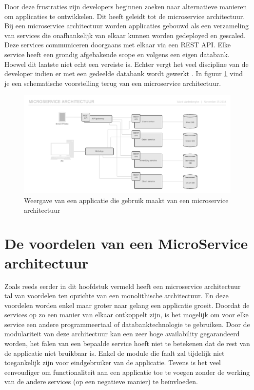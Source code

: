 Door deze frustraties zijn developers beginnen zoeken naar alternatieve manieren om applicaties te ontwikkelen. Dit heeft geleidt tot de microservice architectuur. Bij een microservice architectuur worden applicaties gebouwd als een verzameling van services die onafhankelijk van elkaar kunnen worden gedeployed en gescaled. Deze services communiceren doorgaans met elkaar via een \gls{REST API}. Elke service heeft een grondig afgebakende scope en volgens \textcite{Fowler2014} een eigen databank. Hoewel dit laatste niet echt een vereiste is. Echter vergt het veel discipline van de developer indien er met een gedeelde databank wordt gewerkt \autocite{Young2016}. In figuur \ref{fig:microservices} vind je een schematische voorstelling terug van een microservice architectuur.

\begin{figure}
	\includegraphics[width=\linewidth]{img/microservices.png}
	\caption{Weergave van een applicatie die gebruik maakt van een microservice architectuur}
	\label{fig:microservices}
\end{figure}

\section{De voordelen van een MicroService architectuur}
Zoals reeds eerder in dit hoofdstuk vermeld heeft een microservice architectuur tal van voordelen ten opzichte van een monolithische architectuur. En deze voordelen worden enkel maar groter naar gelang een applicatie groeit. Doordat de services op zo een manier van elkaar ontkoppelt zijn, is het mogelijk om voor elke service een andere programmeertaal of databanktechnologie te gebruiken. Door de modulariteit van deze architectuur kan een zeer hoge availability gegarandeerd worden, het falen van een bepaalde service hoeft niet te betekenen dat de rest van de applicatie niet bruikbaar is. Enkel de module die faalt zal tijdelijk niet toegankelijk zijn voor eindgebruiker van de applicatie. Tevens is het veel eenvoudiger om functionaliteit aan een applicatie toe te voegen zonder de werking van de andere services (op een negatieve manier) te beïnvloeden.


